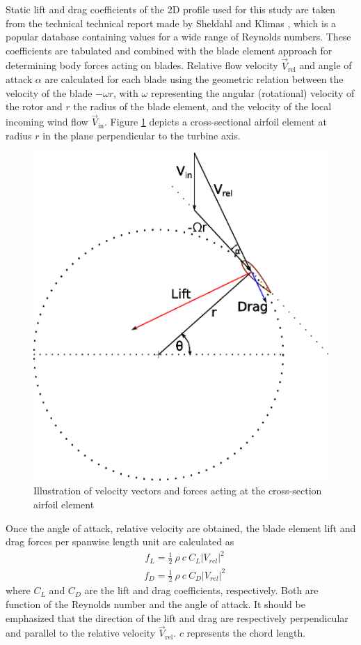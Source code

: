 \documentclass[a4paper]{jpconf}
\begin{document}
Static lift and drag coefficients of the 2D profile used for this study are
taken from the technical technical report made by Sheldahl and Klimas
\cite{sheldahl1981aerodynamic}, which is a popular database containing values
for a wide range of Reynolds numbers. These coefficients are tabulated and
combined with the blade element approach for determining body forces acting on
blades. Relative flow velocity $\vec{V}_{\mathrm{rel}}$ and angle of attack
$\alpha$ are calculated for each blade using the geometric relation between the
velocity of the blade $- \omega r$, with $\omega$ representing the angular
(rotational) velocity of the rotor and $r$ the radius of the blade element, and
the velocity of the local incoming wind flow $\vec{V}_{\mathrm{in}}$. Figure
\ref{figvectors} depicts a cross-sectional airfoil element at radius $r$ in the
plane perpendicular to the turbine axis.

\begin{figure}[h]
\begin{center}
\includegraphics[width=0.35\columnwidth]{vector.eps}
\end{center}
\caption{\label{figvectors} Illustration of velocity vectors and forces acting at the cross-section airfoil element}
\end{figure}

Once the angle of attack, relative velocity are obtained, the blade element lift and drag forces per spanwise length unit are calculated as
\begin{align}
& f_L = \frac{1}{2} \ \rho \ c \ C_L \left| V_{rel} \right|^2  \label{lift}
\end{align} %
\begin{align}
& f_D = \frac{1}{2} \ \rho \ c \ C_D \left| V_{rel} \right|^2  \label{drag}
\end{align} %
where $C_L$ and $C_D$ are the lift and drag coefficients, respectively. Both are
function of the Reynolds number and the angle of attack. It should be emphasized
that the direction of the lift and drag are respectively perpendicular and
parallel to the relative velocity $\vec{V}_{\mathrm{rel}}$. $c$ represents the
chord length.
\end{document}
